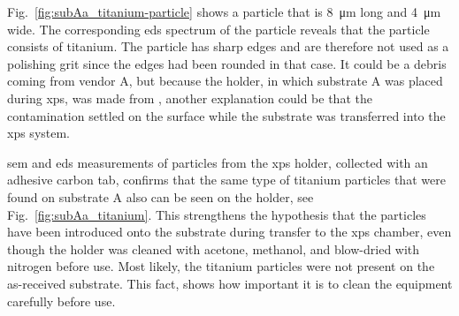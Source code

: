 \begin{comment}
\begin{figure}[htbp]
    \centering
    \subfigure[SEM image at a magnification of 7000$\times$.]{\texttt{[image: substrateA\_a2\_m011.jpg]}\label{fig:substrateA_a2_m011}}
    \quad
    \subfigure[EDS.]{\texttt{[image: eds\_subA\_CZT.jpg]}\label{fig:eds_subA_CZT}}
    \caption[]{Scanning electron microscopy (SEM) image and the corresponding \acf{eds} spectrum of a particle on substrate A at a magnification of 7000$\times$).}
    \label{fig:subA_czt}
\end{figure}
\end{comment}

Fig.~\ref{fig:subAa_titanium-particle} shows a particle that is \SI{8}{\micro\metre} long and \SI{4}{\micro\metre} wide. The corresponding \ac{eds} spectrum of the particle reveals that the particle consists of titanium. The particle has sharp edges and are therefore not used as a polishing grit since the edges had been rounded in that case. It could be a debris coming from vendor A, but because the holder, in which substrate A was placed during \ac{xps}, was made from , another explanation could be that the contamination settled on the surface while the substrate was transferred into the \ac{xps} system.

\begin{comment}
\begin{figure}[htbp]
    \centering
    \subfigure[SEM image at a magnification of 12000$\times$.]{\texttt{[image: titan\_sem.jpg]}\label{fig:titan_sem}}
    \quad
    \subfigure[EDS.]{\texttt{[image: titan\_eds.jpg]}\label{fig:titan_eds}}
    \caption[]{Scanning electron microscopy (SEM) image and the corresponding \acf{eds} spectrum of a particle on substrate A at a magnification of 12000$\times$).}
    \label{fig:subA_Ti}
\end{figure}
\end{comment}


\Ac{sem} and \ac{eds} measurements of particles from the \ac{xps} holder, collected with an adhesive carbon tab, confirms that the same type of titanium particles that were found on substrate A also can be seen on the holder, see Fig.~\ref{fig:subAa_titanium}. This strengthens the hypothesis that the particles have been introduced onto the substrate during transfer to the \ac{xps} chamber, even though the holder was cleaned with acetone, methanol, and blow-dried with nitrogen before use. Most likely, the titanium particles were not present on the as-received substrate. This fact, shows how important it is to clean the equipment carefully before use.

